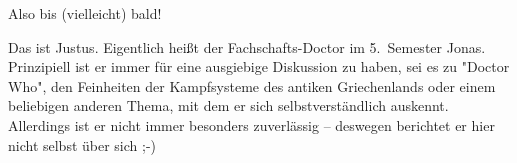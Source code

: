 \begin{multicols*}{2}
{Also bis (vielleicht) bald! }

{Das ist Justus. Eigentlich heißt der Fachschafts-Doctor im 5.~Semester Jonas.
Prinzipiell ist er immer für eine ausgiebige Diskussion zu haben, sei es zu "Doctor Who", den Feinheiten der Kampfsysteme des antiken Griechenlands oder einem beliebigen anderen Thema, mit dem er sich selbstverständlich auskennt.
Allerdings ist er nicht immer besonders zuverlässig -- deswegen berichtet er hier nicht selbst über sich ;-)}



\end{multicols*}
